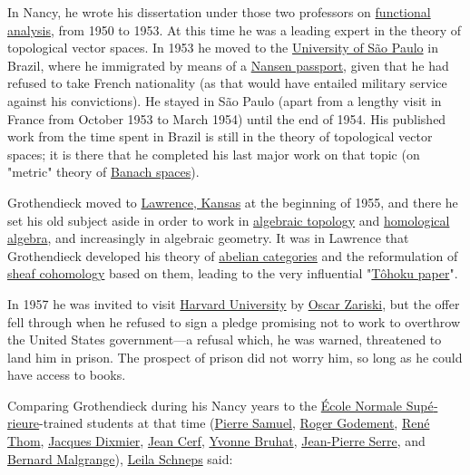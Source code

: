 In Nancy, he wrote his dissertation under those two professors on \href{https://en.wikipedia.org/wiki/Functional_analysis}{functional analysis}, from 1950 to 1953. At this time he was a leading expert in the theory of topological vector spaces. In 1953 he moved to the \href{https://en.wikipedia.org/wiki/University_of_São_Paulo}{University of São Paulo} in Brazil, where he immigrated by means of a \href{https://en.wikipedia.org/wiki/Nansen_passport}{Nansen passport}, given that he had refused to take French nationality (as that would have entailed military service against his convictions). He stayed in São Paulo (apart from a lengthy visit in France from October 1953 to March 1954) until the end of 1954. His published work from the time spent in Brazil is still in the theory of topological vector spaces; it is there that he completed his last major work on that topic (on "metric" theory of \href{https://en.wikipedia.org/wiki/Banach_space}{Banach spaces}).

Grothendieck moved to \href{https://en.wikipedia.org/wiki/Lawrence,_Kansas}{Lawrence, Kansas} at the beginning of 1955, and there he set his old subject aside in order to work in \href{https://en.wikipedia.org/wiki/Algebraic_topology}{algebraic topology} and \href{https://en.wikipedia.org/wiki/Homological_algebra}{homological algebra}, and increasingly in algebraic geometry. It was in Lawrence that Grothendieck developed his theory of \href{https://en.wikipedia.org/wiki/Abelian_categories}{abelian categories} and the reformulation of \href{https://en.wikipedia.org/wiki/Sheaf_cohomology}{sheaf cohomology} based on them, leading to the very influential "\href{https://en.wikipedia.org/wiki/Grothendieck's_Tôhoku_paper}{Tôhoku paper}".

In 1957 he was invited to visit \href{https://en.wikipedia.org/wiki/Harvard_University}{Harvard University} by \href{https://en.wikipedia.org/wiki/Oscar_Zariski}{Oscar Zariski}, but the offer fell through when he refused to sign a pledge promising not to work to overthrow the United States government---a refusal which, he was warned, threatened to land him in prison. The prospect of prison did not worry him, so long as he could have access to books.

Comparing Grothendieck during his Nancy years to the {\foreignlanguage{french}{\href{https://en.wikipedia.org/wiki/École_Normale_Supérieure}{École Normale Supérieure}}}-trained students at that time (\href{https://en.wikipedia.org/wiki/Pierre_Samuel}{Pierre Samuel}, \href{https://en.wikipedia.org/wiki/Roger_Godement}{Roger Godement}, \href{https://en.wikipedia.org/wiki/René_Thom}{René Thom}, \href{https://en.wikipedia.org/wiki/Jacques_Dixmier}{Jacques Dixmier}, \href{https://en.wikipedia.org/wiki/Jean_Cerf}{Jean Cerf}, \href{https://en.wikipedia.org/wiki/Yvonne_Bruhat}{Yvonne Bruhat}, \href{https://en.wikipedia.org/wiki/Jean-Pierre_Serre}{Jean-Pierre Serre}, and \href{https://en.wikipedia.org/wiki/Bernard_Malgrange}{Bernard Malgrange}), \href{https://en.wikipedia.org/wiki/Leila_Schneps}{Leila Schneps} said:

